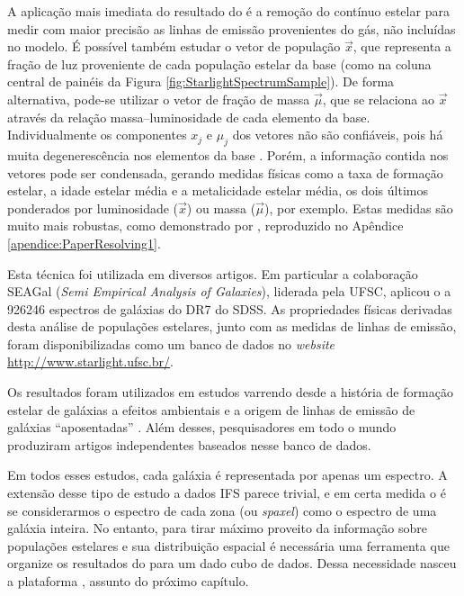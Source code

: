 
A aplicação mais imediata do resultado do \starlight é a remoção do contínuo
estelar para medir com maior precisão as linhas de emissão provenientes do gás,
não incluídas no modelo. É possível também estudar o vetor de população
$\vec{x}$, que representa a fração de luz proveniente de cada população estelar
da base (como na coluna central de painéis da Figura
\ref{fig:StarlightSpectrumSample}). De forma alternativa, pode-se utilizar o
vetor de fração de massa $\vec{\mu}$, que se relaciona ao $\vec{x}$ através da
relação massa--luminosidade de cada elemento da base. Individualmente os
componentes $x_j$ e $\mu_j$ dos vetores não são confiáveis, pois há muita
degenerescência nos elementos da base \citep{CidFernandes2005}. Porém, a
informação contida nos vetores pode ser condensada, gerando medidas físicas como
a taxa de formação estelar, a idade estelar média e a metalicidade estelar
média, os dois últimos ponderados por luminosidade ($\vec{x}$) ou massa
($\vec{\mu}$), por exemplo. Estas medidas são muito mais robustas, como
demonstrado por \citet{CidFernandes2014}, reproduzido no Apêndice
\ref{apendice:PaperResolving1}.


Esta técnica foi utilizada em diversos artigos. Em particular a colaboração
SEAGal ({\em Semi Empirical Analysis of Galaxies}), liderada pela UFSC, aplicou
o \starlight a 926246 espectros de galáxias do DR7 do SDSS. As propriedades
físicas derivadas desta análise de populações estelares, junto com as medidas de
linhas de emissão, foram disponibilizadas como um banco de dados no {\em
website} \url{http://www.starlight.ufsc.br/}.

Os resultados foram utilizados em estudos varrendo desde a história de formação
estelar de galáxias \citep{Asari2007} a efeitos ambientais \citep{Mateus2007} e
a origem de linhas de emissão de galáxias ``aposentadas'' \citep{Stasinska2008,
CidFernandes2011}. Além desses, pesquisadores em todo o mundo produziram artigos
independentes \citep[para citar alguns]{Bian2006, Liang2007, Peeples2009,
Lara-Lopez2009, Lara-Lopez2010} baseados nesse banco de dados.

Em todos esses estudos, cada galáxia é representada por apenas um espectro. A
extensão desse tipo de estudo a dados IFS parece trivial, e em certa medida o é
se considerarmos o espectro de cada zona (ou {\em spaxel}) como o espectro de
uma galáxia inteira. No entanto, para tirar máximo proveito da informação sobre
populações estelares e sua distribuição espacial é necessária uma ferramenta que
organize os resultados do \starlight para um dado cubo de dados. Dessa
necessidade nasceu a plataforma \pycasso, assunto do próximo capítulo.

%


